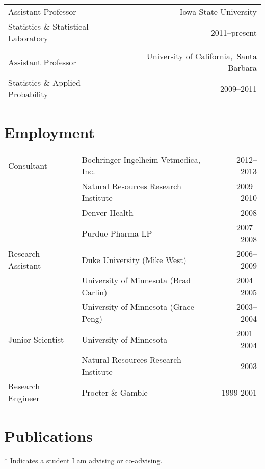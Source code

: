 \documentclass[overlapped,line]{res}
\begin{document}
\begin{resume}
\begin{tabular}{l@{\qquad}r}
Assistant Professor & Iowa State University \\
Statistics \& Statistical Laboratory & 2011--present \\
\\
Assistant Professor & University of California,\ Santa Barbara \\
Statistics \& Applied Probability & 2009--2011
\end{tabular}


\section{\bf Employment}

\begin{tabular}{l@{\qquad}l@{\qquad}r}
Consultant & Boehringer Ingelheim Vetmedica, Inc. & 2012--2013 \\
 & Natural Resources Research Institute  & 2009--2010 \\
 & Denver Health & 2008 \\
 & Purdue Pharma LP & 2007--2008 \\
Research Assistant & Duke University (Mike West) & 2006--2009 \\
 & University of Minnesota (Brad Carlin) & 2004--2005 \\
 & University of Minnesota (Grace Peng) & 2003--2004 \\
Junior Scientist & University of Minnesota & 2001--2004 \\
 & Natural Resources Research Institute & 2003 \\
Research Engineer & Procter \& Gamble & 1999-2001
\end{tabular}


\section{Publications}

* Indicates a student I am advising or co-advising.

\vspace{-0.3in}




\end{resume}
\end{document}
